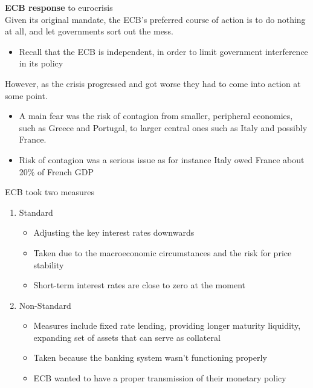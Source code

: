\documentclass{beamer}
\begin{document}
\begin{frame}
  \textbf{ECB response} to eurocrisis\\
   Given its original mandate, the ECB's preferred course of action is to do nothing at all, and let governments sort out the mess.
   \begin{itemize}
      \item Recall that the ECB is independent, in order to limit government interference in its policy
    \end{itemize} 
    However, as the crisis progressed and got worse they had to come into action at some point. 
    \begin{itemize}
      \item A main fear was the risk of contagion from smaller, peripheral economies, such as Greece and Portugal, to larger central ones such as Italy and possibly France.
      \item Risk of contagion was a serious issue as for instance Italy owed France about 20\% of French GDP
    \end{itemize}
\end{frame}

\begin{frame}
  ECB took two measures
  \begin{enumerate}
    \item Standard
  \begin{itemize}
    \item Adjusting the key interest rates downwards
    \item Taken due to the macroeconomic circumstances and the risk for price stability
    \item Short-term interest rates are close to zero at the moment
  \end{itemize}
  \item Non-Standard
  \begin{itemize}
    \item Measures include fixed rate lending, providing longer maturity liquidity, expanding set of assets that can serve as collateral
    \item Taken because the banking system wasn't functioning properly
    \item ECB wanted to have a proper transmission of their monetary policy    
  \end{itemize}
  \end{enumerate}
\end{frame}
\end{document}
